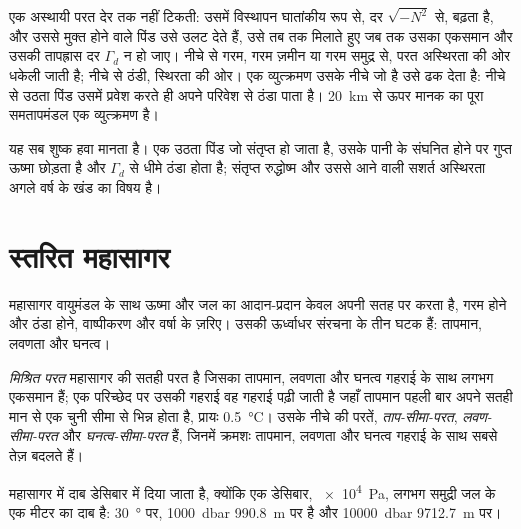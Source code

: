 एक अस्थायी परत देर तक नहीं टिकती: उसमें विस्थापन घातांकीय रूप से, दर $\sqrt{-N^2}$ से, बढ़ता है, और उससे मुक्त होने वाले पिंड उसे उलट देते हैं, उसे तब तक मिलाते हुए जब तक उसका  एकसमान और उसकी तापह्रास दर $\Gamma_d$ न हो जाए। नीचे से गरम, गरम ज़मीन या गरम समुद्र से, परत अस्थिरता की ओर धकेली जाती है; नीचे से ठंडी, स्थिरता की ओर। एक व्युत्क्रमण उसके नीचे जो है उसे ढक देता है: नीचे से उठता पिंड उसमें प्रवेश करते ही अपने परिवेश से ठंडा पाता है। \qty{20}{km} से ऊपर मानक का पूरा समतापमंडल एक व्युत्क्रमण है।

यह सब शुष्क हवा मानता है। एक उठता पिंड जो संतृप्त हो जाता है, उसके पानी के संघनित होने पर गुप्त ऊष्मा छोड़ता है और $\Gamma_d$ से धीमे ठंडा होता है; संतृप्त रुद्धोष्म और उससे आने वाली सशर्त अस्थिरता अगले वर्ष के खंड का विषय है।

\section{स्तरित महासागर}\label{sec:b1:fluid-envelopes-structure:ocean}

महासागर वायुमंडल के साथ ऊष्मा और जल का आदान-प्रदान केवल अपनी सतह पर करता है, गरम होने और ठंडा होने, वाष्पीकरण और वर्षा के ज़रिए। उसकी ऊर्ध्वाधर संरचना के तीन घटक हैं: तापमान, लवणता और घनत्व।

\begin{definition}\label{def:b1:fluid-envelopes-structure:ocean-layers}
\emph{मिश्रित परत} महासागर की सतही परत है जिसका तापमान, लवणता और घनत्व गहराई के साथ लगभग एकसमान हैं; एक परिच्छेद पर उसकी गहराई वह गहराई पढ़ी जाती है जहाँ तापमान पहली बार अपने सतही मान से एक चुनी सीमा से भिन्न होता है, प्रायः \qty{0.5}{\celsius}। उसके नीचे की परतें, \emph{ताप-सीमा-परत}, \emph{लवण-सीमा-परत} और \emph{घनत्व-सीमा-परत} हैं, जिनमें क्रमशः तापमान, लवणता और घनत्व गहराई के साथ सबसे तेज़ बदलते हैं।
\end{definition}

महासागर में दाब डेसिबार में दिया जाता है, क्योंकि एक डेसिबार, \qty{e4}{Pa}, लगभग समुद्री जल के एक मीटर का दाब है: \qty{30}{\degree}  पर, \qty{1000}{dbar} \qty{990.8}{m} पर है और \qty{10000}{dbar} \qty{9712.7}{m} पर।

